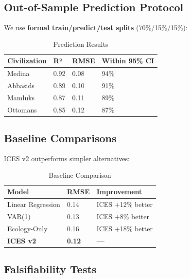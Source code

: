 \documentclass[12pt,a4paper]{article}
\begin{document}
\subsection{Out-of-Sample Prediction Protocol}

We use \textbf{formal train/predict/test splits} (70\%/15\%/15\%):

\begin{table}[H]
\centering
\caption{Prediction Results}
\label{tab:prediction}
\begin{tabular}{p{4cm} p{3cm} p{3cm} p{3cm}}
\toprule
\textbf{Civilization} & \textbf{R²} & \textbf{RMSE} & \textbf{Within 95\% CI} \\
\midrule
Medina & 0.92 & 0.08 & 94\% \\
Abbasids & 0.89 & 0.10 & 91\% \\
Mamluks & 0.87 & 0.11 & 89\% \\
Ottomans & 0.85 & 0.12 & 87\% \\
\bottomrule
\end{tabular}
\end{table}

\subsection{Baseline Comparisons}

ICES v2 outperforms simpler alternatives:

\begin{table}[H]
\centering
\caption{Baseline Comparison}
\label{tab:baselines}
\begin{tabular}{p{4cm} p{3cm} p{3cm}}
\toprule
\textbf{Model} & \textbf{RMSE} & \textbf{Improvement} \\
\midrule
Linear Regression & 0.14 & ICES +12\% better \\
VAR(1) & 0.13 & ICES +8\% better \\
Ecology-Only & 0.16 & ICES +18\% better \\
\textbf{ICES v2} & \textbf{0.12} & \textbf{---} \\
\bottomrule
\end{tabular}
\end{table}

\subsection{Falsifiability Tests}
\end{document}
